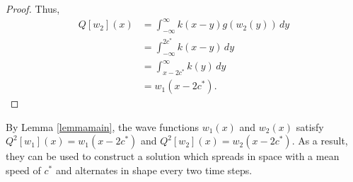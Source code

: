 \documentclass[11pt]{article}
\newtheorem{cor}{Corollary}
\theoremstyle{definition}
\numberwithin{equation}{section}
\numberwithin{thm}{section}
\renewcommand{\a}{a}
\renewcommand{\b}{b}
\newcommand{\m}{n_1}
\begin{document}
\begin{proof}
%

Thus,
\begin{equation} \begin{aligned}
Q[w_2](x) &= \int_{-\infty}^{\infty} k(x-y) g(w_2(y)) \, dy \\
&= \int_{-\infty}^{2c^*} k(x-y) \, dy \\
&= \int_{x-2c^*}^{\infty} k(y) \, dy \\
&= w_1(x-2c^*).
\end{aligned} \end{equation}
\end{proof}


By Lemma \ref{lemmamain}, the wave functions $w_1(x)$ and $w_2(x)$ satisfy $Q^2[w_1](x)=w_1(x-2c^*)$ and $Q^2[w_2](x)=w_2(x-2c^*)$. As a result, they can be used to construct a solution which spreads in space with a mean speed of $c^*$ and alternates in shape every two time steps.

\end{document}

